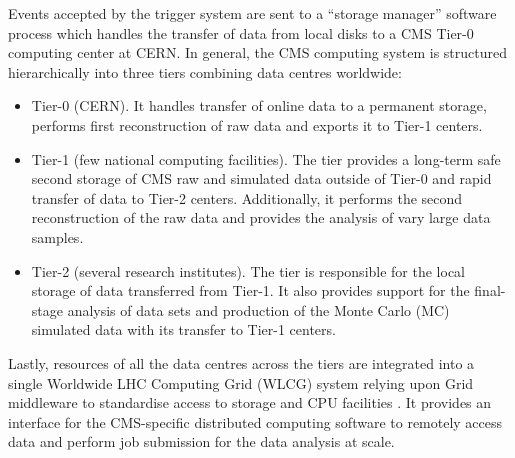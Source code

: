 Events accepted by the trigger system are sent to a \enquote{storage manager} software process which handles the transfer of data from local disks to a CMS Tier-0 computing center at CERN. In general, the CMS computing system is structured hierarchically into three tiers combining data centres worldwide: 
\begin{itemize}
    \item Tier-0 (CERN). It handles transfer of online data to a permanent storage, performs first reconstruction of raw data and exports it to Tier-1 centers.
    \item Tier-1 (few national computing facilities). The tier provides a long-term safe second storage of CMS raw and simulated data outside of Tier-0 and rapid transfer of data to Tier-2 centers. Additionally, it performs the second reconstruction of the raw data and provides the analysis of vary large data samples.
    \item Tier-2 (several research institutes). The tier is responsible for the local storage of data transferred from Tier-1. It also provides support for the final-stage analysis of data sets and production of the Monte Carlo (MC) simulated data with its transfer to Tier-1 centers.
\end{itemize} 

Lastly, resources of all the data centres across the tiers are integrated into a single Worldwide LHC Computing Grid (WLCG) system relying upon Grid middleware to standardise access to storage and CPU facilities \cite{Bird:2005js}. It provides an interface for the CMS-specific distributed computing software to remotely access data and perform job submission for the data analysis at scale.

